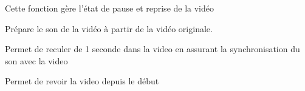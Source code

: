 \documentclass[letterpaper,10pt,english]{sphinxmanual}
\begin{document}
\begin{fulllineitems}
\begin{fulllineitems}
\label{\detokenize{general_interface:general_interface_V9.LecteurVideo.pause_lecture}}
\pysigstartsignatures
{}
\pysigstopsignatures
\sphinxAtStartPar
Cette fonction gère l’état de pause et reprise de la vidéo

\end{fulllineitems}


\begin{fulllineitems}
\label{\detokenize{general_interface:general_interface_V9.LecteurVideo.preparer_son_video}}
\pysigstartsignatures
{}
\pysigstopsignatures
\sphinxAtStartPar
Prépare le son de la vidéo à partir de la vidéo originale.

\end{fulllineitems}


\begin{fulllineitems}
\label{\detokenize{general_interface:general_interface_V9.LecteurVideo.recule_progress}}
\pysigstartsignatures
{}
\pysigstopsignatures
\sphinxAtStartPar
Permet de reculer de 1 seconde dans la video en assurant la synchronisation du son avec la video

\end{fulllineitems}


\begin{fulllineitems}
\label{\detokenize{general_interface:general_interface_V9.LecteurVideo.revoir_video}}
\pysigstartsignatures
{}
\pysigstopsignatures
\sphinxAtStartPar
Permet de revoir la video depuis le début

\end{fulllineitems}


\end{fulllineitems}
\end{document}
